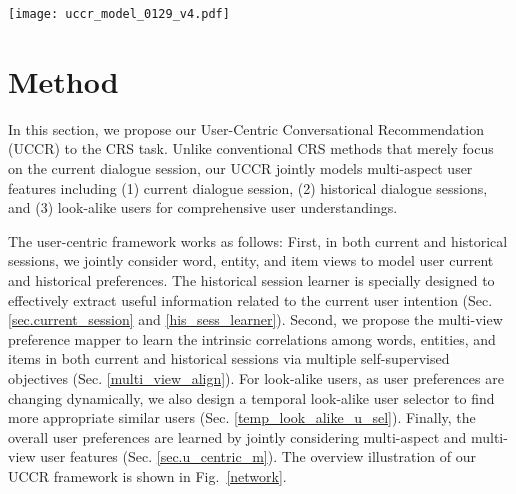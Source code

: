 \documentclass[sigconf,natbib=true]{acmart}
\begin{document}
\begin{figure*}[htpb]\centering  \texttt{[image: uccr\_model\_0129\_v4.pdf]}
	\vspace{-0mm}
	\caption{}
\label{network}
	\vspace{-2mm}
\end{figure*}



\section{Method}
\label{sec_method}



In this section, we propose our User-Centric Conversational Recommendation (UCCR) to the CRS task. Unlike conventional CRS methods \cite{chen2019towards,zhou2020improving,lu2021revcore} that merely focus on the current dialogue session, our UCCR jointly models multi-aspect user features including (1) current dialogue session, (2) historical dialogue sessions, and (3) look-alike users for comprehensive user understandings.

The user-centric framework works as follows:
First, in both current and historical sessions, we jointly consider word, entity, and item views to model user current and historical preferences. The historical session learner is specially designed to effectively extract useful information related to the current user intention (Sec. \ref{sec.current_session} and \ref{his_sess_learner}).
Second, we propose the multi-view preference mapper to learn the intrinsic correlations among words, entities, and items in both current and historical sessions via multiple self-supervised objectives (Sec. \ref{multi_view_align}).
For look-alike users, as user preferences are changing dynamically, we also design a temporal look-alike user selector to find more appropriate similar users (Sec. \ref{temp_look_alike_u_sel}).
Finally, the overall user preferences are learned by jointly considering multi-aspect and multi-view user features (Sec. \ref{sec.u_centric_m}).
The overview illustration of our UCCR framework is shown in Fig.~\ref{network}.
\end{document}
